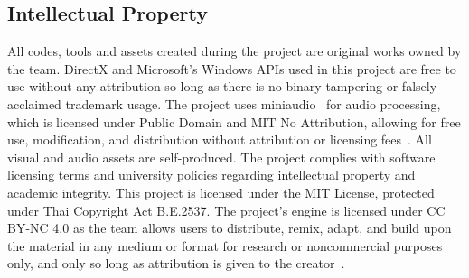 \subsection{Intellectual Property}
\label{subsec:intellectual-property}

All codes, tools and assets created during the project are original works owned by the team.
DirectX and Microsoft's Windows APIs used in this project are free to use without any attribution so long as there is
no binary tampering or falsely acclaimed trademark usage.
The project uses miniaudio~\cite{miniaudio} for audio processing, which is licensed under Public Domain and MIT No Attribution, 
allowing for free use, modification, and distribution without attribution or licensing fees~\cite{MIT0License}.
All visual and audio assets are self-produced.
The project complies with software licensing terms and university policies regarding intellectual property and academic integrity.
This project is licensed under the MIT License, protected under Thai Copyright Act B.E.2537.
The project's engine is licensed under CC BY-NC 4.0 as the team allows users to distribute, remix, adapt, and build upon
the material in any medium or format for research or noncommercial purposes only,
and only so long as attribution is given to the creator~\cite{CreativeCommonsLicense}.